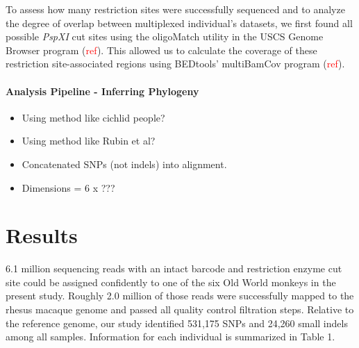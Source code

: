 \documentclass[12pt]{article}
\begin{document}
	To assess how many restriction sites were successfully sequenced and to analyze the degree of overlap between multiplexed individual's datasets, we first found all possible \emph{PspXI} cut sites using the oligoMatch utility in the USCS Genome Browser program (\textcolor{red}{ref}). This allowed us to calculate the coverage of these restriction site-associated regions using BEDtools' multiBamCov program (\textcolor{red}{ref}).

\paragraph{Analysis Pipeline - Inferring Phylogeny}
\begin{itemize}
	\item Using method like cichlid people?
	\item Using method like Rubin et al? 
	\item Concatenated SNPs (not indels) into alignment. 
	\item Dimensions = 6 x ???
\end{itemize}

\section{Results}


6.1 million sequencing reads with an intact barcode and restriction enzyme cut site could be assigned confidently to one of the six Old World monkeys in the present study. Roughly 2.0 million of those reads were successfully mapped to the rhesus macaque genome and passed all quality control filtration steps. Relative to the reference genome, our study identified 531,175 SNPs and 24,260 small indels among all samples. Information for each individual is summarized in Table 1. 
\end{document}
